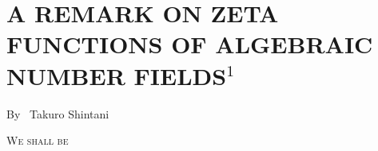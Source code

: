 \chapter{A REMARK ON ZETA FUNCTIONS OF ALGEBRAIC NUMBER FIELDS$^{1}$}


\begin{center}
{\large By~ Takuro Shintani}
\end{center}

\bigskip

\setcounter{pageoriginal}{254}
\textsc{We shall be}\pageoriginale
